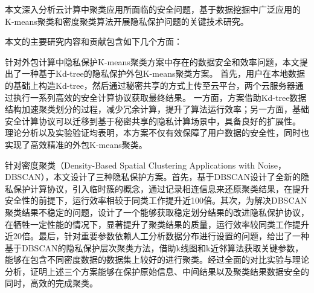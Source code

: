 \begin{cabstract}
本文深入分析云计算中聚类应用所面临的安全问题，基于数据挖掘中广泛应用的K-means聚类和密度聚类算法开展隐私保护问题的关键技术研究。

本文的主要研究内容和贡献包含如下几个方面：
\begin{compactenum}
\item 针对外包计算中隐私保护K-means聚类方案中存在的数据安全和效率问题，本文提出了一种基于Kd-tree的隐私保护外包K-means聚类方案。
首先，用户在本地数据的基础上构造Kd-tree，然后通过秘密共享的方式上传至云平台，两个云服务器通过执行一系列高效的安全计算协议获取最终结果。
一方面，方案借助Kd-tree数据结构加速聚类划分的过程，减少冗余计算，提升了算法运行效率；另一方面，基础安全计算协议可以迁移到基于秘密共享的隐私计算场景中，具备良好的扩展性。
理论分析以及实验验证均表明，本方案不仅有效保障了用户数据的安全性，同时也实现了高效精准的外包K-means聚类。

\item 针对密度聚类（Density-Based Spatial Clustering Applications with Noise，DBSCAN），本文设计了三种隐私保护方案。首先，基于DBSCAN设计了全新的隐私保护计算协议，引入临时簇的概念，通过记录相连信息来还原聚类结果，在提升安全性的前提下，运行效率相较于同类工作提升近100倍。其次，为解决DBSCAN聚类结果不稳定的问题，设计了一个能够获取稳定划分结果的改进隐私保护协议，在牺牲一定性能的情况下，显著提升了聚类结果的质量，运行效率较同类工作提升近20倍。最后，针对重要参数依赖人工分析数据分布进行设置的问题，给出了一种基于DBSCAN的隐私保护层次聚类方法，借助k线图和k近邻算法获取关键参数，能够在包含不同密度数据的数据集上较好的进行聚类。经过全面的对比实验与理论分析，证明上述三个方案能够在保护原始信息、中间结果以及聚类结果数据安全的同时，高效的完成聚类。   
\end{compactenum}                                               
\end{cabstract}

